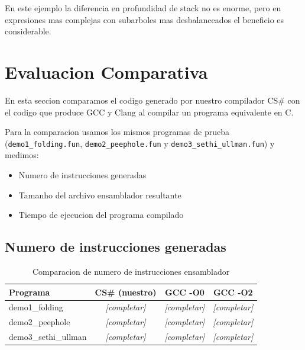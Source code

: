 \documentclass[12pt, a4paper]{article}
\begin{document}
En este ejemplo la diferencia en profundidad de stack no es enorme, pero en expresiones mas complejas con subarboles mas desbalanceados el beneficio es considerable.

\newpage

\section{Evaluacion Comparativa}

En esta seccion comparamos el codigo generado por nuestro compilador CS\# con el codigo que produce GCC y Clang al compilar un programa equivalente en C.

Para la comparacion usamos los mismos programas de prueba (\texttt{demo1\_folding.fun}, \texttt{demo2\_peephole.fun} y \texttt{demo3\_sethi\_ullman.fun}) y medimos:

\begin{itemize}
    \item Numero de instrucciones generadas
    \item Tamanho del archivo ensamblador resultante
    \item Tiempo de ejecucion del programa compilado
\end{itemize}


\subsection{Numero de instrucciones generadas}

\begin{table}[H]
\centering
\begin{tabular}{lccc}
\toprule
\textbf{Programa} & \textbf{CS\# (nuestro)} & \textbf{GCC -O0} & \textbf{GCC -O2} \\
\midrule
demo1\_folding & \textit{[completar]} & \textit{[completar]} & \textit{[completar]} \\
demo2\_peephole & \textit{[completar]} & \textit{[completar]} & \textit{[completar]} \\
demo3\_sethi\_ullman & \textit{[completar]} & \textit{[completar]} & \textit{[completar]} \\
\bottomrule
\end{tabular}
\caption{Comparacion de numero de instrucciones ensamblador}
\end{table}
\end{document}
